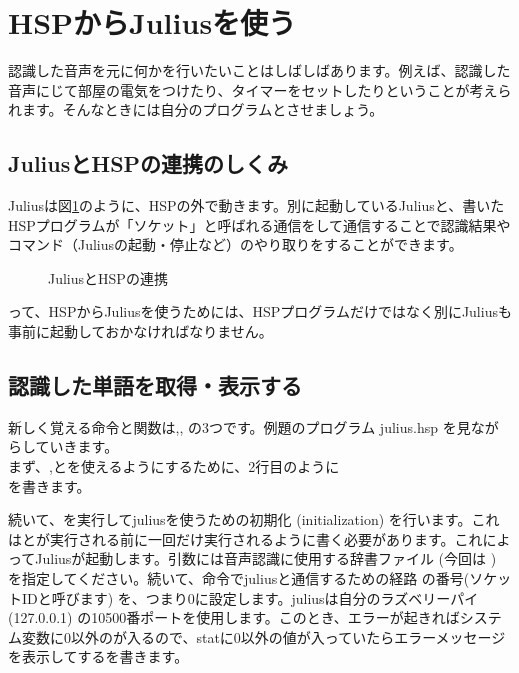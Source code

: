 \newpage
\section{HSPからJuliusを使う}
認識した音声を元に何かを行いたいことはしばしばあります。例えば、認識した音声にじて部屋の電気をつけたり、タイマーをセットしたりということが考えられます。そんなときには自分のプログラムとさせましょう。
\subsection{JuliusとHSPの連携のしくみ}
Juliusは図\ref{JuliusとHSPの連携}のように、HSPの外で動きます。別に起動しているJuliusと、書いたHSPプログラムが「ソケット」と呼ばれる通信をして通信することで認識結果やコマンド（Juliusの起動・停止など）のやり取りをすることができます。
\begin{figure}[H]
\begin{center}
    
    \caption{JuliusとHSPの連携}
    \label{JuliusとHSPの連携}
\end{center}
\end{figure}
って、HSPからJuliusを使うためには、HSPプログラムだけではなく別にJuliusも事前に起動しておかなければなりません。

\subsection{認識した単語を取得・表示する}
新しく覚える命令と関数は,,  の3つです。例題のプログラム julius.hsp を見ながらしていきます。\\

まず、,とを使えるようにするために、2行目のように\\
を書きます。

続いて、を実行してjuliusを使うための初期化 (initialization) を行います。これはとが実行される前に一回だけ実行されるように書く必要があります。これによってJuliusが起動します。引数には音声認識に使用する辞書ファイル (今回は ) を指定してください。続いて、命令でjuliusと通信するための経路 の番号(ソケットIDと呼びます) を、つまり0に設定します。juliusは自分のラズベリーパイ (127.0.0.1) の10500番ポートを使用します。このとき、エラーが起きればシステム変数に0以外のが入るので、statに0以外の値が入っていたらエラーメッセージを表示してするを書きます。


